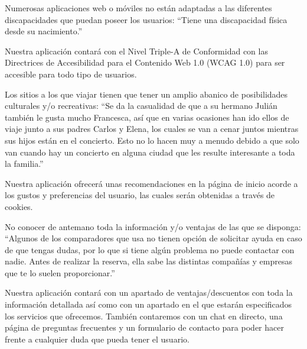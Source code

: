     \begin{problema}

        Numerosas aplicaciones web o móviles no están adaptadas a las diferentes discapacidades que puedan poseer los usuarios: ``Tiene una discapacidad física desde su nacimiento.''
    
        {\centering\begin{vision}
        Nuestra aplicación contará con el Nivel Triple-A de Conformidad con las Directrices de Accesibilidad para el Contenido Web 1.0 (WCAG 1.0) para ser accesible para todo tipo de usuarios.
        \end{vision}}
        \end{problema}
    
    \begin{problema}

    Los sitios a los que viajar tienen que tener un amplio abanico de posibilidades culturales y/o recreativas: ``Se da la casualidad de que a su hermano Julián también le gusta mucho Francesca, así que en varias ocasiones han ido ellos de viaje junto a sus padres Carlos y Elena, los cuales se van a cenar juntos mientras sus hijos están en el concierto. Esto no lo hacen muy a menudo debido a que solo van cuando hay un concierto en alguna ciudad que les resulte interesante a toda la familia.''

    {\centering\begin{vision}
    Nuestra aplicación ofrecerá unas recomendaciones en la página de inicio acorde a los gustos y preferencias del usuario, las cuales serán obtenidas a través de cookies.
    \end{vision}}
    \end{problema}
    
    
    
    \begin{problema}

    No conocer de antemano toda la información y/o ventajas de las que se disponga: ``Algunos de los comparadores que usa no tienen opción de solicitar ayuda en caso de que tengas dudas, por lo que si tiene algún problema no puede contactar con nadie. Antes de realizar la reserva, ella sabe las distintas compañías y empresas que te lo suelen proporcionar.''

    {\centering\begin{vision}
    Nuestra aplicación contará con un apartado de ventajas/descuentos con toda la información detallada así como con un apartado en el que estarán especificados los servicios que ofrecemos. También contaremos con un chat en directo, una página de preguntas frecuentes y un formulario de contacto para poder hacer frente a cualquier duda que pueda tener el usuario.
    \end{vision}}
    \end{problema}
    

